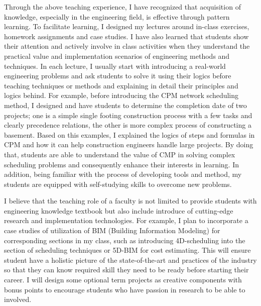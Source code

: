 \documentclass[a4paper,11pt]{article}
\begin{document}
%
%
\par
Through the above teaching experience, I have recognized that acquisition of knowledge, especially in the engineering field, is effective through pattern learning. To facilitate learning, I designed my lectures around in-class exercises, homework assignments and case studies. 
%
I have also learned that students show their attention and actively involve in class activities when they understand the practical value and implementation scenarios of engineering methods and techniques.
%
In each lecture, I usually start with introducing a real-world engineering problems and ask students to solve it using their logics before teaching techniques or methods and explaining in detail their principles and logics behind.
%
For example, before introducing the CPM network scheduling method, I designed and have students to determine the completion date of two projects; one is a simple single footing construction process with a few tasks and clearly precedence relations, the other is more complex process of constructing a basement. Based on this examples, I explained the logics of steps and formulas in CPM and how it can help construction engineers handle large projects. 
%
By doing that, students are able to understand the value of CMP in solving complex scheduling problems and consequently enhance their interests in learning. In addition, being familiar with the process of developing tools and method, my students are equipped with self-studying skills to overcome new problems. 
%
\par
I believe that the teaching role of a faculty is not limited to provide students with engineering knowledge textbook but also include introduce of cutting-edge research and implementation technologies. For example, I plan to incorporate a case studies of utilization of BIM (Building Information Modeling) for corresponding sections in my class, such as introducing 4D-scheduling into the section of scheduling techniques or 5D-BIM for cost estimating. This will ensure student have a holistic picture of the state-of-the-art and practices of the industry so that they can know required skill they need to be ready before starting their career. I will design some optional term projects as creative components with bonus points to encourage students who have passion in research to be able to involved. 
%
\end{document}
